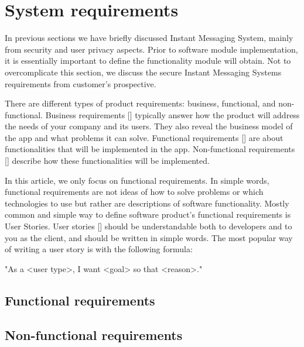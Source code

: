 \chapter{System requirements}\label{ch:system-requirements}

In previous sections we have briefly discussed Instant Messaging System, mainly from security and user privacy aspects.
Prior to software module implementation, it is essentially important to define the functionality module will obtain.
Not to overcomplicate this section, we discuss the secure Instant Messaging Systems requirements from customer's prospective.

There are different types of product requirements: business, functional, and non-functional.
Business requirements [\cite{dilworth2007creation}] typically answer how the product will address the needs of your company and its users.
They also reveal the business model of the app and what problems it can solve.
Functional requirements [\cite{malan2001functional}] are about functionalities that will be implemented in the app.
Non-functional requirements [\cite{chung2012non}] describe how these functionalities will be implemented.

In this article, we only focus on functional requirements.
In simple words, functional requirements are not ideas of how to solve problems or which technologies to use but rather
are descriptions of software functionality.
Mostly common and simple way to define software product's functional requirements is User Stories.
User stories [\cite{cohn2004user}] should be understandable both to developers and to you as the client, and should be written in simple words.
The most popular way of writing a user story is with the following formula:

\begin{center}
    "As a <user type>, I want <goal> so that <reason>."
\end{center}


\section{Functional requirements}\label{sec:functional-requirements}



\section{Non-functional requirements}\label{sec:non-functional-requirements}



